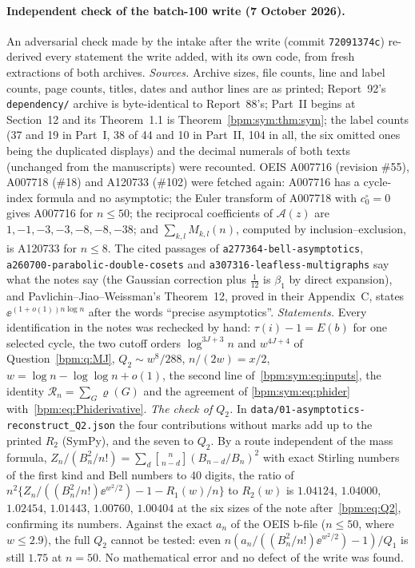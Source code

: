 \documentclass[11pt,a4paper]{article}
\theoremstyle{remark}\newtheorem{remark}[theorem]{Remark}%
\begin{document}
\paragraph{Independent check of the batch-100 write (7 October 2026).} An
adversarial check made by the intake after the write (commit
\texttt{72091374c}) re-derived every statement the write added, with its
own code, from fresh extractions of both archives. \emph{Sources.} Archive
sizes, file counts, line and label counts, page counts, titles, dates and
author lines are as printed; Report~92's \nolinkurl{dependency/} archive is
byte-identical to Report~88's; Part~II begins at Section~12 and its
Theorem~1.1 is Theorem~\ref{bpm:sym:thm:sym}; the label counts (37 and 19
in Part~I, 38 of 44 and 10 in Part~II, 104 in all, the six omitted ones
being the duplicated displays) and the decimal numerals of both texts
(unchanged from the manuscripts) were recounted. OEIS A007716 (revision
\#55), A007718 (\#18) and A120733 (\#102) were fetched again: A007716 has a
cycle-index formula and no asymptotic; the Euler transform of A007718 with
$c^\circ_0=0$ gives A007716 for $n\le50$; the reciprocal coefficients of
$\mathcal A(z)$ are $1,-1,-3,-3,-8,-8,-38$; and $\sum_{k,l}M_{k,l}(n)$,
computed by inclusion--exclusion, is A120733 for $n\le8$. The cited
passages of \nolinkurl{a277364-bell-asymptotics},
\nolinkurl{a260700-parabolic-double-cosets} and
\nolinkurl{a307316-leafless-multigraphs} say what the notes say (the
Gaussian correction plus $\frac1{12}$ is $\beta_1$ by direct expansion), and
Pavlichin--Jiao--Weissman's Theorem~12, proved in their Appendix~C, states
$\ee^{(1+o(1))n\log n}$ after the words ``precise asymptotics''.
\emph{Statements.} Every identification in the notes was rechecked by hand:
$\tau(i)-1=E(b)$ for one selected cycle, the two cutoff orders
$\log^{3J+3}n$ and $w^{4J+4}$ of Question~\ref{bpm:q:MJ},
$Q_2\sim w^8/288$, $n/(2w)=x/2$, $w=\log n-\log\log n+o(1)$, the
second line of~\eqref{bpm:sym:eq:inputs}, the identity
$\mathcal R_n=\sum_G\varrho(G)$ and the agreement of
\eqref{bpm:sym:eq:phider} with~\eqref{bpm:eq:Phiderivative}. \emph{The
check of $Q_2$.} In \nolinkurl{data/01-asymptotics-reconstruct_Q2.json} the
four contributions without marks add up to the printed $R_2$ (SymPy), and
the seven to $Q_2$. By a route independent of the mass formula,
$Z_n/(B_n^2/n!)=\sum_d\genfrac[]{0pt}{}{n}{n-d}(B_{n-d}/B_n)^2$ with exact Stirling
numbers of the first kind and Bell numbers to 40 digits, the ratio of
$n^2\{Z_n/((B_n^2/n!)\ee^{w^2/2})-1-R_1(w)/n\}$ to $R_2(w)$ is $1.04124$,
$1.04000$, $1.02454$, $1.01443$, $1.00760$, $1.00404$ at the six sizes of
the note after~\eqref{bpm:eq:Q2}, confirming its numbers. Against the
exact $a_n$ of the OEIS b-file ($n\le50$, where $w\le2.9$), the full $Q_2$
cannot be tested: even $n(a_n/((B_n^2/n!)\ee^{w^2/2})-1)/Q_1$ is still
$1.75$ at $n=50$. No mathematical error and no defect of the write was
found.
\end{document}

